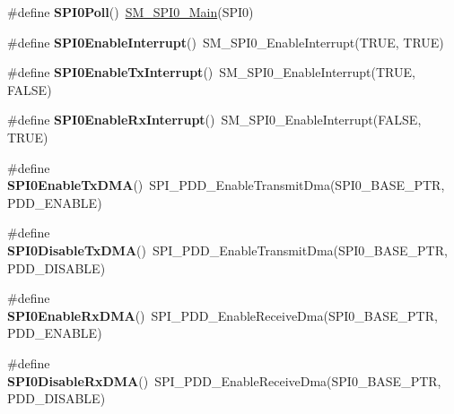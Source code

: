 \begin{DoxyCompactItemize}
\item 
\hypertarget{group___func_ala_ga569c2fcf03d5516b3f3171ceb5907ddb}{\#define {\bfseries S\-P\-I0\-Poll}()~\hyperlink{group___s_m___s_p_i0__module_ga9b4318e9ea51a4ef1ed0dd4ecf114d39}{S\-M\-\_\-\-S\-P\-I0\-\_\-\-Main}(S\-P\-I0)}\label{group___func_ala_ga569c2fcf03d5516b3f3171ceb5907ddb}

\item 
\hypertarget{group___func_ala_ga6d0dc3f4479e8211c521474603901d8f}{\#define {\bfseries S\-P\-I0\-Enable\-Interrupt}()~S\-M\-\_\-\-S\-P\-I0\-\_\-\-Enable\-Interrupt(T\-R\-U\-E, T\-R\-U\-E)}\label{group___func_ala_ga6d0dc3f4479e8211c521474603901d8f}

\item 
\hypertarget{group___func_ala_gab0d5b29c2712a0174863b651e69d66bf}{\#define {\bfseries S\-P\-I0\-Enable\-Tx\-Interrupt}()~S\-M\-\_\-\-S\-P\-I0\-\_\-\-Enable\-Interrupt(T\-R\-U\-E, F\-A\-L\-S\-E)}\label{group___func_ala_gab0d5b29c2712a0174863b651e69d66bf}

\item 
\hypertarget{group___func_ala_ga35979ba6a9d01a9b05835edb197926a1}{\#define {\bfseries S\-P\-I0\-Enable\-Rx\-Interrupt}()~S\-M\-\_\-\-S\-P\-I0\-\_\-\-Enable\-Interrupt(F\-A\-L\-S\-E, T\-R\-U\-E)}\label{group___func_ala_ga35979ba6a9d01a9b05835edb197926a1}

\item 
\hypertarget{group___func_ala_ga0da23d3a42c39caf0bba6107ceb5dc79}{\#define {\bfseries S\-P\-I0\-Enable\-Tx\-D\-M\-A}()~S\-P\-I\-\_\-\-P\-D\-D\-\_\-\-Enable\-Transmit\-Dma(S\-P\-I0\-\_\-\-B\-A\-S\-E\-\_\-\-P\-T\-R, P\-D\-D\-\_\-\-E\-N\-A\-B\-L\-E)}\label{group___func_ala_ga0da23d3a42c39caf0bba6107ceb5dc79}

\item 
\hypertarget{group___func_ala_gaddd531aff9139ae8014065780fc09d3a}{\#define {\bfseries S\-P\-I0\-Disable\-Tx\-D\-M\-A}()~S\-P\-I\-\_\-\-P\-D\-D\-\_\-\-Enable\-Transmit\-Dma(S\-P\-I0\-\_\-\-B\-A\-S\-E\-\_\-\-P\-T\-R, P\-D\-D\-\_\-\-D\-I\-S\-A\-B\-L\-E)}\label{group___func_ala_gaddd531aff9139ae8014065780fc09d3a}

\item 
\hypertarget{group___func_ala_gae5c45c42ed3a9bef459176109002d4ad}{\#define {\bfseries S\-P\-I0\-Enable\-Rx\-D\-M\-A}()~S\-P\-I\-\_\-\-P\-D\-D\-\_\-\-Enable\-Receive\-Dma(S\-P\-I0\-\_\-\-B\-A\-S\-E\-\_\-\-P\-T\-R, P\-D\-D\-\_\-\-E\-N\-A\-B\-L\-E)}\label{group___func_ala_gae5c45c42ed3a9bef459176109002d4ad}

\item 
\hypertarget{group___func_ala_gacbd24accc7e32547ed78b278f879cd5d}{\#define {\bfseries S\-P\-I0\-Disable\-Rx\-D\-M\-A}()~S\-P\-I\-\_\-\-P\-D\-D\-\_\-\-Enable\-Receive\-Dma(S\-P\-I0\-\_\-\-B\-A\-S\-E\-\_\-\-P\-T\-R, P\-D\-D\-\_\-\-D\-I\-S\-A\-B\-L\-E)}\label{group___func_ala_gacbd24accc7e32547ed78b278f879cd5d}

\end{DoxyCompactItemize}

